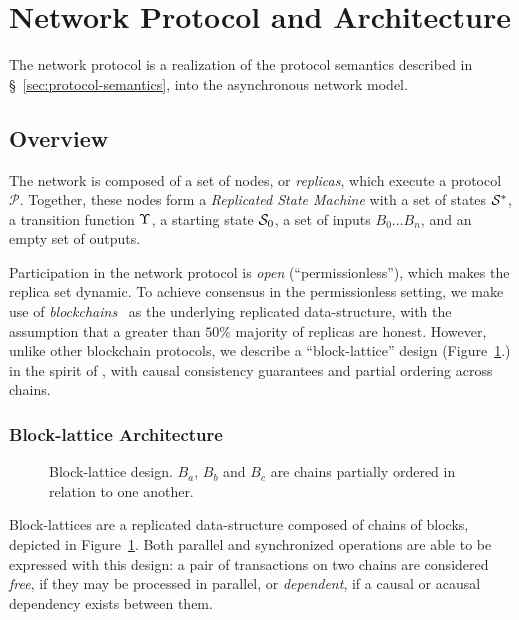\section{Network Protocol and Architecture}

The \oscoin{} network protocol is a realization of the protocol semantics
described in \S~\ref{sec:protocol-semantics}, into the asynchronous network
model.

\subsection{Overview}

The \oscoin{} network is composed of a set of nodes, or \emph{replicas}, which
execute a protocol $\mathcal{P}$. Together, these nodes form a \emph{Replicated
State Machine} with a set of states $\mathcal{S}^*$, a transition function $\Upsilon$,
a starting state $\mathcal{S}_0$, a set of inputs $B_0 \dotso B_n$, and an empty set
of outputs.


Participation in the network protocol is \emph{open} (\ie ``permissionless''),
which makes the replica set dynamic. To achieve consensus in the permissionless
setting, we make use of \emph{blockchains}~\cite{bitcoin} as the underlying
replicated data-structure, with the assumption that a greater than $50\%$
majority of replicas are honest.  However, unlike other blockchain protocols,
we describe a ``block-lattice'' design (Figure~\ref{block-lattice}.) in the
spirit of \cite{raiblocks}, with causal consistency guarantees
\cite{causal-consistency} and partial ordering across chains.

\subsubsection{Block-lattice Architecture}

\begin{figure}[hbp]
    
    \caption{Block-lattice design. $B_a$, $B_b$ and $B_c$ are chains partially ordered in relation to one another.\label{block-lattice}}
\end{figure}

Block-lattices are a replicated data-structure composed of chains of blocks,
depicted in Figure~\ref{block-lattice}.  Both parallel and synchronized
operations are able to be expressed with this design:  a pair of transactions
on two chains are considered \emph{free}, if they may be processed in parallel,
or \emph{dependent}, if a causal or acausal dependency exists between them.

